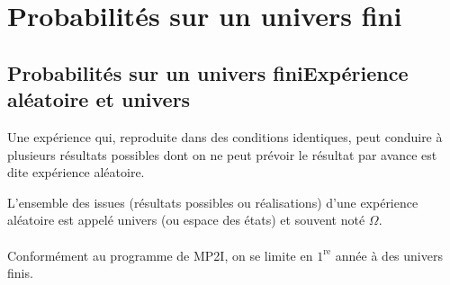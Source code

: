 \section{Probabilités sur un univers fini}
\subsection{Probabilités sur un univers finiExpérience aléatoire et univers}
\begin{defprop}
    Une expérience qui, reproduite dans des conditions identiques, peut conduire à plusieurs résultats possibles dont on ne peut prévoir le résultat par avance est dite expérience aléatoire.
\end{defprop}
\begin{defprop}[Univers]
    L’ensemble des issues (résultats possibles ou réalisations) d’une expérience aléatoire est appelé univers (ou espace des états) et souvent noté \(\Omega\). \\~\\
    Conformément au programme de MP2I, on se limite en \(1^{\text{re}}\) année à des univers finis.
\end{defprop}

